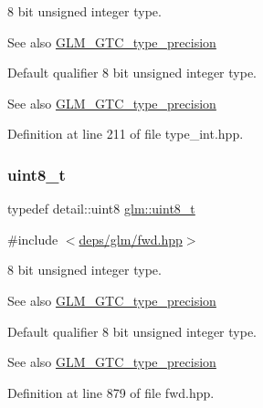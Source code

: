 8 bit unsigned integer type. \begin{DoxySeeAlso}{See also}
\hyperlink{group__gtc__type__precision}{G\+L\+M\+\_\+\+G\+T\+C\+\_\+type\+\_\+precision}
\end{DoxySeeAlso}
Default qualifier 8 bit unsigned integer type. \begin{DoxySeeAlso}{See also}
\hyperlink{group__gtc__type__precision}{G\+L\+M\+\_\+\+G\+T\+C\+\_\+type\+\_\+precision} 
\end{DoxySeeAlso}


Definition at line 211 of file type\+\_\+int.\+hpp.

\mbox{\label{group__gtc__type__precision_ga93adf6dd9803408f3e3aaf9dedda352b}} 
\subsubsection{\texorpdfstring{uint8\+\_\+t}{uint8\_t}}
{\footnotesize\ttfamily typedef detail\+::uint8 \hyperlink{group__gtc__type__precision_ga93adf6dd9803408f3e3aaf9dedda352b}{glm\+::uint8\+\_\+t}}



{\ttfamily \#include $<$\hyperlink{fwd_8hpp}{deps/glm/fwd.\+hpp}$>$}

8 bit unsigned integer type. \begin{DoxySeeAlso}{See also}
\hyperlink{group__gtc__type__precision}{G\+L\+M\+\_\+\+G\+T\+C\+\_\+type\+\_\+precision}
\end{DoxySeeAlso}
Default qualifier 8 bit unsigned integer type. \begin{DoxySeeAlso}{See also}
\hyperlink{group__gtc__type__precision}{G\+L\+M\+\_\+\+G\+T\+C\+\_\+type\+\_\+precision} 
\end{DoxySeeAlso}


Definition at line 879 of file fwd.\+hpp.

